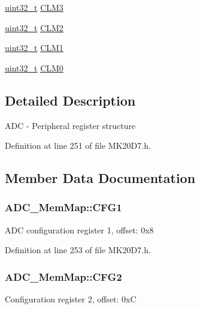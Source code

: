 \begin{DoxyCompactItemize}
\hyperlink{_p_e___types_8h_a33594304e786b158f3fb30289278f5af}{uint32\+\_\+t} \hyperlink{struct_a_d_c___mem_map_a326c171566746f11f9b808930253df85}{C\+L\+M3}
\item 
\hyperlink{_p_e___types_8h_a33594304e786b158f3fb30289278f5af}{uint32\+\_\+t} \hyperlink{struct_a_d_c___mem_map_a2794a4dac3b6ec18535eeae7c7e2d4e3}{C\+L\+M2}
\item 
\hyperlink{_p_e___types_8h_a33594304e786b158f3fb30289278f5af}{uint32\+\_\+t} \hyperlink{struct_a_d_c___mem_map_a6c07d3719b54b23926239b53919f36d2}{C\+L\+M1}
\item 
\hyperlink{_p_e___types_8h_a33594304e786b158f3fb30289278f5af}{uint32\+\_\+t} \hyperlink{struct_a_d_c___mem_map_a1b8eeb87fa8308fe93200b6e82985c25}{C\+L\+M0}
\end{DoxyCompactItemize}


\subsection{Detailed Description}
A\+DC -\/ Peripheral register structure 

Definition at line 251 of file M\+K20\+D7.\+h.



\subsection{Member Data Documentation}
\subsubsection[{\texorpdfstring{C\+F\+G1}{CFG1}}]{ A\+D\+C\+\_\+\+Mem\+Map\+::\+C\+F\+G1}\hypertarget{struct_a_d_c___mem_map_a2320de82d9559e930bc71650b02993b7}{}\label{struct_a_d_c___mem_map_a2320de82d9559e930bc71650b02993b7}
A\+DC configuration register 1, offset\+: 0x8 

Definition at line 253 of file M\+K20\+D7.\+h.

\subsubsection[{\texorpdfstring{C\+F\+G2}{CFG2}}]{ A\+D\+C\+\_\+\+Mem\+Map\+::\+C\+F\+G2}\hypertarget{struct_a_d_c___mem_map_aa39dedc8da290763fa121dc4c99dc5a4}{}\label{struct_a_d_c___mem_map_aa39dedc8da290763fa121dc4c99dc5a4}
Configuration register 2, offset\+: 0xC 

